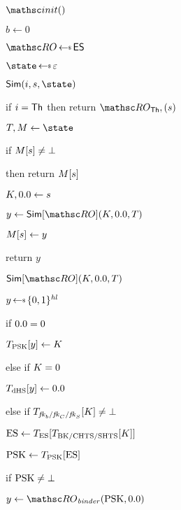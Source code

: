 \begin{figure}[tp]
	\begin{minipage}[t]{0.48\textwidth}
		\NewExperiment[Game $\Gm_0$]
		
		\begin{algorithm}{$\Initialize()$}
			\item $b \gets 0$
			\item $\RO \getsr \ESp$
			\item $\state \getsr \emptystring$
		\end{algorithm}
			\ExptSepSpace
			\begin{oracle}{$\Sim(\simIndex,\simInString,\state)$}
				\item if $i=\mathsf{Th}$ then return $\ROthash, (\simInString)$
				\item $\rlookuptable, \cachetable \gets \state$
				\item if $M[s] \neq \bot$
				\item \quad then return $M[s]$
				\item $\hmackey,\hmactext \gets \simInString$
				\item $\simOut \gets \simulator[\RO](\hmackey, \hmactext,\rlookuptable)$
				\item $M[s] \gets y$
				\item return $y$
			\end{oracle}
		\ExptSepSpace
		\begin{oracle}{$\Sim[\RO](\hmackey, \hmactext, \rlookuptable)$}
		\item[] 
		\item $\simOut \getsr \bits^{\hashlen}$
		
		\item if $\hmactext = 0$ 
		\item \quad $T_{\mathrm{PSK}}[y] \gets K$
		
		\item else if $K = 0$ 
		\item \quad $\rlookuptable_{\dhs}[\simOut] \gets \hmactext$ 
		
		\item else if $T_{\mathit{fk}_b/\mathit{fk}_C/\mathit{fk}_S}[K]\neq \bot$
		
			\item \quad $\mathrm{ES} \gets T_{\mathrm{ES}}[T_{\mathrm{BK}/\mathrm{CHTS}/\mathrm{SHTS}}[K]]$
		\item \quad $\mathrm{PSK} \gets T_{\mathrm{PSK}}[\mathrm{ES}]$
		\item \quad if $\mathrm{PSK} \neq \bot$ 
		\item \quad \quad $\simOut \gets \RObinder(\psk, \hmactext)$
		

\end{oracle}
\end{minipage}
\end{figure}
